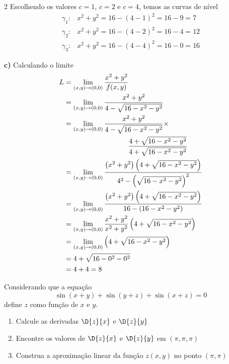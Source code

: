 \documentclass[a4paper,12pt,fleqn]{article}
\begin{document}
\begin{answer}
\begin{multicols*}{2}
Escolhendo os valores $c=1$, $c=2$ e $c=4$, temos as curvas de nível
\begin{align*}
  \gamma_1\colon & x^2 + y^2 = 16 - (4 - 1)^2 = 16 - 9 = 7  \\
  \gamma_2\colon & x^2 + y^2 = 16 - (4 - 2)^2 = 16 - 4 = 12 \\
  \gamma_3\colon & x^2 + y^2 = 16 - (4 - 4)^2 = 16 - 0 = 16
\end{align*}

\vspace{\baselineskip}
\textbf{c)\;}
Calculando o limite
\setlength{\jot}{12pt}
\setlength{\mathindent}{0cm}
\begin{align*}
  L
  & = \lim_{(x, y)\to(0, 0)} \frac{x^2+y^2}{f(x, y)} \\
  & = \lim_{(x, y)\to(0, 0)} \frac{x^2+y^2}{4 - \sqrt{16-x^2-y^2}} \\
  & = \lim_{(x, y)\to(0, 0)} \frac{x^2+y^2}{4 - \sqrt{16-x^2-y^2}} \times \\
  & \hspace{32mm}            \frac{4 + \sqrt{16-x^2-y^2}}{4 + \sqrt{16-x^2-y^2}} \\
  & = \lim_{(x, y)\to(0, 0)} \frac{\left(x^2+y^2\right)\left(4 + \sqrt{16-x^2-y^2}\right)}
                                  {4^2 - \left(\sqrt{16-x^2-y^2}\right)^2} \\
  & = \lim_{(x, y)\to(0, 0)} \frac{\left(x^2+y^2\right)\left(4 + \sqrt{16-x^2-y^2}\right)}
                                  {16 - (16-x^2-y^2)} \\
  & = \lim_{(x, y)\to(0, 0)} \frac{x^2+y^2}{x^2+y^2}\left(4 + \sqrt{16-x^2-y^2}\right) \\
  & = \lim_{(x, y)\to(0, 0)} \left(4 + \sqrt{16-x^2-y^2}\right) \\
  & = 4 + \sqrt{16-0^2-0^2} \\
  & = 4 + 4 = 8
\end{align*}
\end{multicols*}
\end{answer}

Considerando que a equação
\[
  \sin(x+y) + \sin(y+z) + \sin(x+z) = 0
\]
define $z$ como função de $x$ e $y$.
\begin{enumerate}[label=\alph*)]
  \item Calcule as derivadas \(\D{z}{x}\) e \(\D{z}{y}\)
  \item Encontre os valores de \(\D{z}{x}\) e \(\D{z}{y}\) em \((\pi, \pi, \pi)\)
  \item Construa a aproximação linear da função $z(x, y)$ no ponto \((\pi, \pi)\)
\end{enumerate}
\clearpagequestiononly
\end{document}
